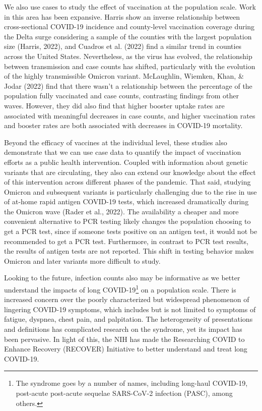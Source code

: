 \documentclass[12pt,twoside]{smiththesis}
\begin{document}
We also use cases to study the effect of vaccination at the population scale. Work in this area has been expansive. Harris show an inverse relationship between cross-sectional COVID-19 incidence and county-level vaccination coverage during the Delta surge considering a sample of the counties with the largest population size (Harris, 2022), and Cuadros et al. (2022) find a similar trend in counties across the United States. Nevertheless, as the virus has evolved, the relationship between transmission and case counts has shifted, particularly with the evolution of the highly transmissible Omicron variant. McLaughlin, Wiemken, Khan, \& Jodar (2022) find that there wasn't a relationship between the percentage of the population fully vaccinated and case counts, contrasting findings from other waves. However, they did also find that higher booster uptake rates are associated with meaningful decreases in case counts, and higher vaccination rates and booster rates are both associated with decreases in COVID-19 mortality.

Beyond the efficacy of vaccines at the individual level, these studies also demonstrate that we can use case data to quantify the impact of vaccination efforts as a public health intervention. Coupled with information about genetic variants that are circulating, they also can extend our knowledge about the effect of this intervention across different phases of the pandemic. That said, studying Omicron and subsequent variants is particularly challenging due to the rise in use of at-home rapid antigen COVID-19 tests, which increased dramatically during the Omicron wave (Rader et al., 2022). The availability a cheaper and more convenient alternative to PCR testing likely changes the population choosing to get a PCR test, since if someone tests positive on an antigen test, it would not be recommended to get a PCR test. Furthermore, in contrast to PCR test results, the results of antigen tests are not reported. This shift in testing behavior makes Omicron and later variants more difficult to study.

Looking to the future, infection counts also may be informative as we better understand the impacts of long COVID-19\footnote{The syndrome goes by a number of names, including long-haul COVID-19, post-acute post-acute sequelae SARS-CoV-2 infection (PASC), among others.} on a population scale. There is increased concern over the poorly characterized but widespread phenomenon of lingering COVID-19 symptoms, which includes but is not limited to symptoms of fatigue, dyspnea, chest pain, and palpitation. The heterogeneity of presentations and definitions has complicated research on the syndrome, yet its impact has been pervasive. In light of this, the NIH has made the Researching COVID to Enhance Recovery (RECOVER) Initiative to better understand and treat long COVID-19.
\end{document}

